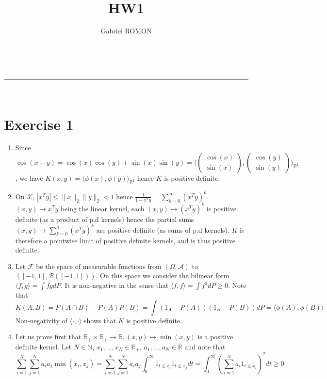 \documentclass[a4paper,11pt, hidelinks]{article}
\makeatletter
\newcommand{\linia}{\rule{\linewidth}{0.5pt}}
\renewcommand{\maketitle}{
\begin{center}
\vspace{2ex}
{\huge \textsc{\@title}}
\vspace{1ex}
\\
\linia\\
\@author 
\vspace{4ex}
\end{center}
}
\makeatother
\begin{document}
\title{HW1}

\author{Gabriel ROMON}



\maketitle
{}
\section*{Exercise 1}
\begin{enumerate}
	\item Since $\cos(x-y) = \cos(x)\cos(y) + \sin(x)\sin(y) = \langle \begin{pmatrix} \cos(x) \\ \sin(x) \end{pmatrix} , \begin{pmatrix} \cos(y) \\ \sin(y) \end{pmatrix}\rangle_{\mathbb R^2}$, we have  $K(x,y) = \langle \phi(x), \phi(y)\rangle_{\mathbb R^2}$ hence $K$ is positive definite.
  \item On $\mathcal X$, $|x^Ty|\leq \|x\|_2 \|y\|_2 < 1$ hence $\displaystyle \frac{1}{1-x^Ty} = \sum_{k=0}^\infty (x^Ty)^k$. $(x,y)\mapsto x^Ty$ being the linear kernel, each $(x,y)\mapsto (x^Ty)^k$ is positive definite (as a product of p.d kernels) hence the partial sums $(x,y) \mapsto \sum_{k=0}^n (x^Ty)^k$ are positive definite (as sums of p.d kernels). $K$ is therefore a pointwise limit of positive definite kernels, and is thus positive definite.
  \item Let $\mathcal F$ be the space of measurable functions from $(\Omega, \mathcal A)$ to $([-1,1], \mathcal B([-1,1]))$. On this space we consider the bilinear form $\langle f, g\rangle = \int fg dP$. It is non-negative in the sense that $\langle f, f\rangle = \int f^2 dP \geq 0$. Note that $$K(A,B)=P(A\cap B)-P(A)P(B) = \int (1_A - P(A))(1_B-P(B)) dP = \langle \phi(A), \phi(B) \rangle$$
  Non-negativity of $\langle \cdot, \cdot \rangle$ shows that $K$ is positive definite.
  \item Let us prove first that $\mathbb R_+\times \mathbb R_+ \to \mathbb R, (x,y)\mapsto \min(x,y)$ is a positive definite kernel. Let $N\in \mathbb N$, $x_1,\ldots, x_N \in \mathbb R_+$, $a_1,\ldots, a_N \in \mathbb R$ and note that $$\sum_{i=1}^N \sum_{j=1}^N a_i a_j \min(x_i,x_j) = \sum_{i=1}^N \sum_{j=1}^N a_i a_j \int_0^\infty 1_{t\leq x_i} 1_{t\leq x_j} dt = \int_0^\infty \left( \sum_{i=1}^N a_i 1_{t\leq x_i}\right)^2 dt \geq 0$$

\end{enumerate}
\end{document}
